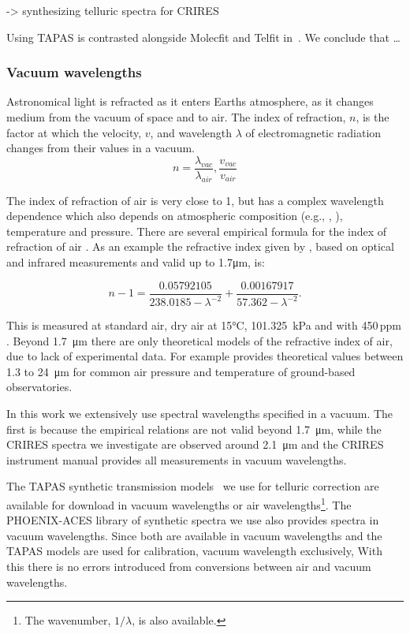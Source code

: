  -> synthesizing telluric spectra \nir{} for {CRIRES}~\cite{seifahrt_synthesising_2010}

Using {TAPAS} is contrasted alongside Molecfit and Telfit in~\cite{ulmer-moll_telluric_2018}. We conclude that \ldots



\subsubsection{Vacuum wavelengths}
Astronomical light is refracted as it enters Earths atmosphere, as it changes medium from the vacuum of space and to air. The index of refraction, \(n\), is the factor at which the velocity, \(v\), and wavelength \(\lambda\) of electromagnetic radiation changes from their values in a vacuum.
\begin{equation}
n  = \frac{\lambda_{vac}}{\lambda_{air}}, \frac{v_{vac}}{v_{air}}
\end{equation}

The index of refraction of air is very close to 1, but has a complex wavelength dependence which also depends on atmospheric composition (e.g., , ), temperature and pressure.
There are several empirical formula for the index of refraction of air \citep[e.g.,][]{edlen_dispersion_1953, peck_dispersion_1972, ciddor_refractive_1996}. As an example the refractive index given by \citet{ciddor_refractive_1996}, based on optical and infrared measurements and valid up to 1.7\si{\micro\meter}, is:

\begin{equation}
    n -1 = \frac{0.05792105}{238.0185 - \lambda^{-2}} + \frac{0.00167917}{57.362 - \lambda^{-2}}.
\end{equation}

This is measured at standard air, dry air at 15\si{\degreeCelsius}, 101.325\ \si{\kilo\pascal} and with 450\,ppm .
Beyond 1.7\ \si{\micro\meter} there are only theoretical models of the refractive index of air, due to lack of experimental data. For example \citet{mathar_refractive_2007} provides theoretical values between 1.3 to 24\ \si{\micro\meter} for common air pressure and temperature of ground-based observatories.

In this work we extensively use spectral wavelengths specified in a vacuum. The first is because the empirical relations are not valid beyond 1.7\ \si{\micro\meter}, while the {CRIRES} spectra we investigate are observed around 2.1\ \si{\micro\meter} and the {CRIRES} instrument manual provides all measurements in vacuum wavelengths.

The {TAPAS} synthetic transmission models~\citet{bertaux_tapas_2014} we use for telluric correction are available for download in vacuum wavelengths or air wavelengths\footnote{The wavenumber, \(1/\lambda\), is also available.}. The {PHOENIX-ACES} library of synthetic spectra we use also provides spectra in vacuum wavelengths.
Since both are available in vacuum wavelengths and the {TAPAS} models are used for calibration, vacuum wavelength exclusively, With this there is no errors introduced from conversions between air and vacuum wavelengths.
